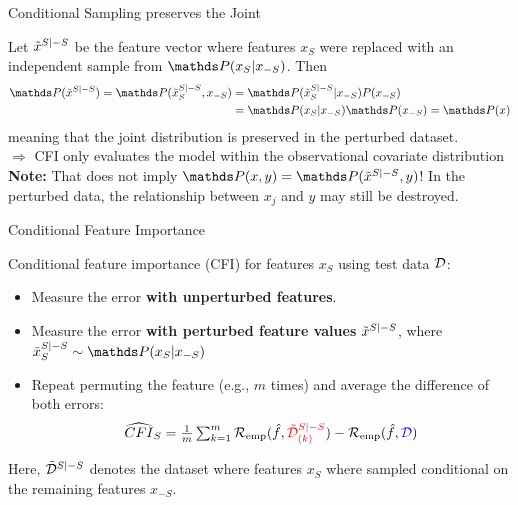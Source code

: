 \documentclass[11pt,compress,t,notes=noshow, aspectratio=169, xcolor=table]{beamer}
\begin{document}
 
 \begin{vbframe}{Conditional Sampling preserves the Joint}
 
 Let $\pert{x}{S}{-S}$ be the feature vector where features $x_S$ were replaced with an independent sample from $\P(x_S|x_{-S})$. Then
%
\begin{align*}
  \P(\pert{x}{S}{-S}) = \P(\pert{x}{S}{-S}_S, x_{-S}) &= \P(\pert{x}{S}{-S}_S|x_{-S}) P(x_{-S})\\
   &= \P(x_S|x_{-S}) \P(x_{-S}) = \P(x)
\end{align*}
 meaning that the joint distribution is preserved in the perturbed dataset.\\
 $\Rightarrow$ CFI only evaluates the model within the observational covariate distribution\\
 \lz
 \textbf{Note:} That does not imply $\P(x,y) = \P(\pert{x}{S}{-S}, y)$! In the perturbed data, the relationship between $x_j$ and $y$ may still be destroyed.\\
 \end{vbframe}



\begin{vbframe}{Conditional Feature Importance  }
\normalsize

Conditional feature importance (CFI) for features $x_S$ using test data $\D$:
\begin{itemize}
  \item Measure the error \color{blue}\textbf{with unperturbed features}\color{black}.
  \item Measure the error \color{red}\textbf{with perturbed feature values} \color{black} $\pert{x}{S}{-S}$, where $\pert{x}{S}{-S}_S \sim \P(x_S|x_{-S})$
  \item Repeat permuting the feature (e.g., $m$ times) and average the difference of both errors: 
$$\widehat{CFI}_S = \tfrac{1}{m} \textstyle\sum\nolimits_{k = 1}^{m} \riske (\fh, {\color{red}\pert{\D}{S}{-S}_{(k)}}) - \riske (\fh, {\color{blue}\D})$$
\end{itemize}

Here, $\pert{\D}{S}{-S}$ denotes the dataset where features $x_S$ where sampled conditional on the remaining features $x_{-S}$.


\end{vbframe}
\end{document}
